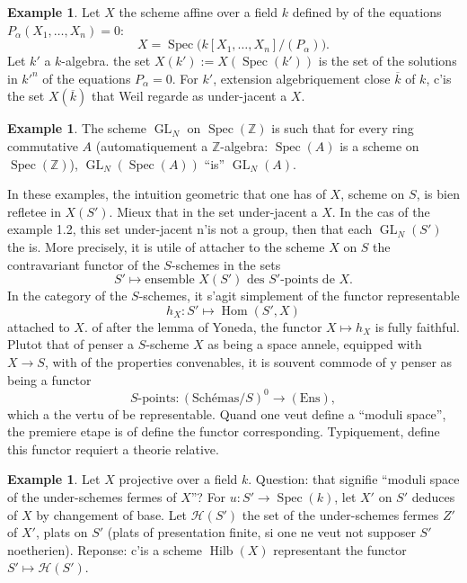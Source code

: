 \documentclass[11pt,a4paper]{article}
\theoremstyle{plain}
\theoremstyle{definition}
\newtheorem{example}[theorem]{Example}
\DeclareMathOperator{\Spec}{Spec}
\DeclareMathOperator{\Hom}{Hom}
\DeclareMathOperator{\Hilb}{Hilb}
\DeclareMathOperator{\GL}{GL}
\begin{document}
\begin{example}
Let $X$ the scheme affine over a field $k$ defined by of the equations $P_\alpha(X_1,\ldots,X_n) = 0$:
\[
X = \Spec\bigl(k[X_1,\ldots,X_n]/(P_\alpha)\bigr).
\]
Let $k'$ a $k$-algebra. the set $X(k') := X(\Spec(k'))$ is the set of the solutions in $k'^n$ of the equations $P_\alpha = 0$. For $k'$, extension algebriquement close $\overline{k}$ of $k$, c'is the set $X(\overline{k})$ that Weil regarde as under-jacent a $X$.
\end{example}

\begin{example}
The scheme $\GL_N$ on $\Spec(\mathbb{Z})$ is such that for every ring commutative $A$ (automatiquement a $\mathbb{Z}$-algebra: $\Spec(A)$ is a scheme on $\Spec(\mathbb{Z})$), $\GL_N(\Spec(A))$ ``is'' $\GL_N(A)$.
\end{example}

In these examples, the intuition geometric that one has of $X$, scheme on $S$, is bien refletee in $X(S')$. Mieux that in the set under-jacent a $X$. In the cas of the example 1.2, this set under-jacent n'is not a group, then that each $\GL_N(S')$ the is. More precisely, it is utile of attacher to the scheme $X$ on $S$ the contravariant functor of the $S$-schemes in the sets
\[
S' \longmapsto \text{ensemble } X(S') \text{ des } S'\text{-points de } X.
\]
In the category of the $S$-schemes, it s'agit simplement of the functor representable
\[
h_X \colon S' \longmapsto \Hom(S', X)
\]
attached to $X$. of after the lemma of Yoneda, the functor $X \mapsto h_X$ is fully faithful. Plutot that of penser a $S$-scheme $X$ as being a space annele, equipped with $X \to S$, with of the properties convenables, it is souvent commode of y penser as being a functor
\[
S\text{-points} \colon (\text{Sch\'emas}/S)^0 \longrightarrow (\text{Ens}),
\]
which a the vertu of be representable. Quand one veut define a ``moduli space'', the premiere etape is of define the functor corresponding. Typiquement, define this functor requiert a theorie relative.

\begin{example}
Let $X$ projective over a field $k$. Question: that signifie ``moduli space of the under-schemes fermes of $X$''? For $u \colon S' \to \Spec(k)$, let $X'$ on $S'$ deduces of $X$ by changement of base. Let $\mathcal{H}(S')$ the set of the under-schemes fermes $Z'$ of $X'$, plats on $S'$ (plats of presentation finite, si one ne veut not supposer $S'$ noetherien). Reponse: c'is a scheme $\Hilb(X)$ representant the functor $S' \mapsto \mathcal{H}(S')$.
\end{example}
\end{document}
